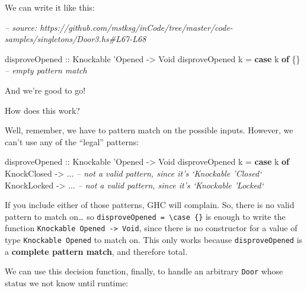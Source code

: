 \documentclass[]{article}
\newenvironment{Shaded}{}{}
\newcommand{\CommentTok}[1]{\textcolor[rgb]{0.38,0.63,0.69}{\textit{#1}}}
\newcommand{\DataTypeTok}[1]{\textcolor[rgb]{0.56,0.13,0.00}{#1}}
\newcommand{\FunctionTok}[1]{\textcolor[rgb]{0.02,0.16,0.49}{#1}}
\newcommand{\KeywordTok}[1]{\textcolor[rgb]{0.00,0.44,0.13}{\textbf{#1}}}
\newcommand{\NormalTok}[1]{#1}
\newcommand{\OtherTok}[1]{\textcolor[rgb]{0.00,0.44,0.13}{#1}}
\begin{document}
We can write it like this:

\begin{Shaded}
\begin{Highlighting}[]
\CommentTok{-- source: https://github.com/mstksg/inCode/tree/master/code-samples/singletons/Door3.hs#L67-L68}

\OtherTok{disproveOpened ::} \DataTypeTok{Knockable}\NormalTok{ '}\DataTypeTok{Opened} \OtherTok{->} \DataTypeTok{Void}
\NormalTok{disproveOpened k }\FunctionTok{=} \KeywordTok{case}\NormalTok{ k }\KeywordTok{of}\NormalTok{ \{\}             }\CommentTok{-- empty pattern match}
\end{Highlighting}
\end{Shaded}

And we're good to go!

How does this work?

Well, remember, we have to pattern match on the possible inputs. However, we
can't use any of the ``legal'' patterns:

\begin{Shaded}
\begin{Highlighting}[]
\OtherTok{disproveOpened ::} \DataTypeTok{Knockable}\NormalTok{ '}\DataTypeTok{Opened} \OtherTok{->} \DataTypeTok{Void}
\NormalTok{disproveOpened k }\FunctionTok{=} \KeywordTok{case}\NormalTok{ k }\KeywordTok{of}
    \DataTypeTok{KnockClosed} \OtherTok{->} \FunctionTok{...}    \CommentTok{-- not a valid pattern, since it's `Knockable 'Closed`}
    \DataTypeTok{KnockLocked} \OtherTok{->} \FunctionTok{...}    \CommentTok{-- not a valid pattern, since it's `Knockable 'Locked`}
\end{Highlighting}
\end{Shaded}

If you include either of those patterns, GHC will complain. So, there is no
valid pattern to match on\ldots{} so
\texttt{disproveOpened\ =\ \textbackslash{}case\ \{\}} is enough to write the
function \texttt{Knockable\ \textquotesingle{}Opened\ -\textgreater{}\ Void},
since there is no constructor for a value of type
\texttt{Knockable\ \textquotesingle{}Opened} to match on. This only works
because \texttt{disproveOpened} is a \textbf{complete pattern match}, and
therefore total.

We can use this decision function, finally, to handle an arbitrary \texttt{Door}
whose status we not know until runtime:
\end{document}
